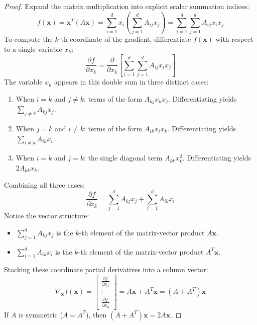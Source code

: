 \begin{proof}
Expand the matrix multiplication into explicit scalar summation indices:
\begin{equation}
f(\mathbf{x}) = \mathbf{x}^T (A\mathbf{x}) = \sum_{i=1}^d x_i \left( \sum_{j=1}^d A_{ij} x_j \right) = \sum_{i=1}^d \sum_{j=1}^d A_{ij} x_i x_j
\end{equation}
To compute the $k$-th coordinate of the gradient, differentiate $f(\mathbf{x})$ with respect to a single variable $x_k$:
\begin{equation}
\frac{\partial f}{\partial x_k} = \frac{\partial}{\partial x_k} \left[ \sum_{i=1}^d \sum_{j=1}^d A_{ij} x_i x_j \right]
\end{equation}
The variable $x_k$ appears in this double sum in three distinct cases:
\begin{enumerate}
    \item When $i = k$ and $j \ne k$: terms of the form $A_{kj} x_k x_j$. Differentiating yields $\sum_{j \ne k} A_{kj} x_j$.
    \item When $j = k$ and $i \ne k$: terms of the form $A_{ik} x_i x_k$. Differentiating yields $\sum_{i \ne k} A_{ik} x_i$.
    \item When $i = k$ and $j = k$: the single diagonal term $A_{kk} x_k^2$. Differentiating yields $2A_{kk} x_k$.
\end{enumerate}
Combining all three cases:
\begin{equation}
\frac{\partial f}{\partial x_k} = \sum_{j=1}^d A_{kj} x_j + \sum_{i=1}^d A_{ik} x_i
\end{equation}
Notice the vector structure:
\begin{itemize}
    \item $\sum_{j=1}^d A_{kj} x_j$ is the $k$-th element of the matrix-vector product $A\mathbf{x}$.
    \item $\sum_{i=1}^d A_{ik} x_i$ is the $k$-th element of the matrix-vector product $A^T \mathbf{x}$.
\end{itemize}
Stacking these coordinate partial derivatives into a column vector:
\begin{equation}
\nabla_{\mathbf{x}} f(\mathbf{x}) = \begin{bmatrix} \frac{\partial f}{\partial x_1} \\ \vdots \\ \frac{\partial f}{\partial x_d} \end{bmatrix} = A\mathbf{x} + A^T \mathbf{x} = (A + A^T)\mathbf{x}
\end{equation}
If $A$ is symmetric ($A = A^T$), then $(A + A^T)\mathbf{x} = 2A\mathbf{x}$.
\end{proof}

